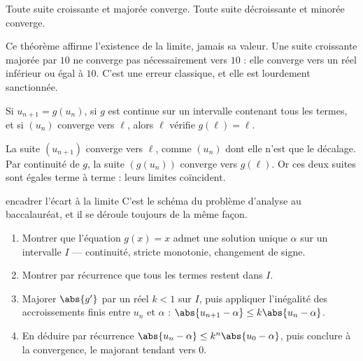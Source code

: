 \begin{theoreme}
Toute suite croissante et majorée converge. Toute suite décroissante et
minorée converge.
\end{theoreme}

\begin{avertissement}
Ce théorème affirme l'existence de la limite, jamais sa valeur. Une suite
croissante majorée par $10$ ne converge pas nécessairement vers $10$ : elle
converge vers un réel inférieur ou égal à $10$. C'est une erreur classique, et
elle est lourdement sanctionnée.
\end{avertissement}

\begin{theoreme}
Si $u_{n+1} = g(u_{n})$, si $g$ est continue sur un intervalle contenant tous
les termes, et si $(u_{n})$ converge vers $\ell$, alors $\ell$ vérifie
$g(\ell) = \ell$.
\end{theoreme}

\begin{demonstration}
La suite $(u_{n+1})$ converge vers $\ell$, comme $(u_{n})$ dont elle n'est que
le décalage. Par continuité de $g$, la suite $\left(g(u_{n})\right)$ converge
vers $g(\ell)$. Or ces deux suites sont égales terme à terme : leurs limites
coïncident.
\end{demonstration}

\begin{methode}{encadrer l'écart à la limite}
C'est le schéma du problème d'analyse au baccalauréat, et il se déroule
toujours de la même façon.
\begin{enumerate}[label=\textbf{\arabic*.}, leftmargin=*, itemsep=0.15em]
  \item Montrer que l'équation $g(x) = x$ admet une solution unique $\alpha$
        sur un intervalle $I$ — continuité, stricte monotonie, changement de
        signe.
  \item Montrer par récurrence que tous les termes restent dans $I$.
  \item Majorer $\abs{g'}$ par un réel $k<1$ sur $I$, puis appliquer
        l'inégalité des accroissements finis entre $u_{n}$ et $\alpha$ :
        $\abs{u_{n+1}-\alpha} \leq k\abs{u_{n}-\alpha}$.
  \item En déduire par récurrence
        $\abs{u_{n}-\alpha} \leq k^{n}\abs{u_{0}-\alpha}$, puis conclure à la
        convergence, le majorant tendant vers $0$.
\end{enumerate}
\end{methode}

